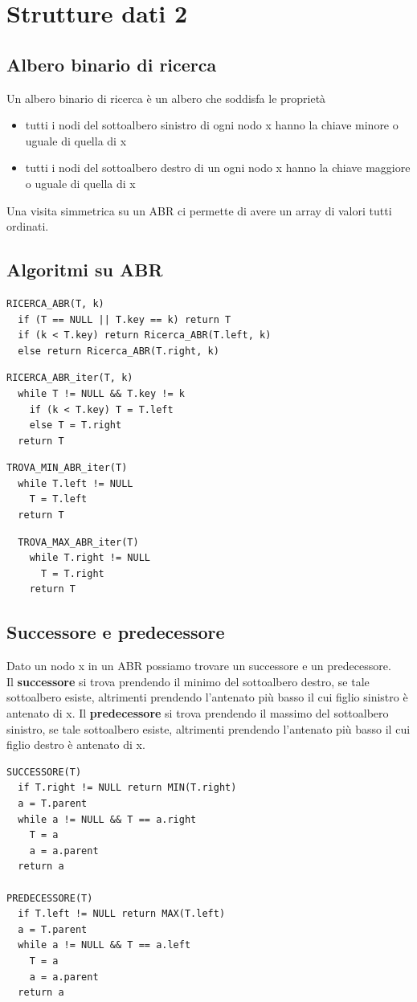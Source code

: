 \documentclass{article}
\begin{document}
\section{Strutture dati 2}
\subsection{Albero binario di ricerca}
Un albero binario di ricerca è un albero che soddisfa le proprietà
\begin{itemize}
  \item tutti i nodi del sottoalbero sinistro di ogni nodo x hanno la chiave minore o uguale di quella di x
  \item tutti i nodi del sottoalbero destro di un ogni nodo x hanno la chiave maggiore o uguale di quella di x
\end{itemize}
Una visita simmetrica su un ABR ci permette di avere un array di valori tutti ordinati.
\subsection*{Algoritmi su ABR}
\begin{lstlisting}
RICERCA_ABR(T, k)
  if (T == NULL || T.key == k) return T
  if (k < T.key) return Ricerca_ABR(T.left, k)
  else return Ricerca_ABR(T.right, k)
\end{lstlisting}
\begin{lstlisting}
RICERCA_ABR_iter(T, k)
  while T != NULL && T.key != k
    if (k < T.key) T = T.left
    else T = T.right
  return T
\end{lstlisting}
\begin{lstlisting}
TROVA_MIN_ABR_iter(T)
  while T.left != NULL
    T = T.left
  return T
\end{lstlisting}
\begin{lstlisting}
  TROVA_MAX_ABR_iter(T)
    while T.right != NULL
      T = T.right
    return T
\end{lstlisting}
\subsection*{Successore e predecessore}
Dato un nodo x in un ABR possiamo trovare un successore e un predecessore.\\
Il \textbf{successore} si trova prendendo il minimo del sottoalbero destro, se tale sottoalbero esiste, altrimenti prendendo l'antenato più basso il cui figlio sinistro è antenato di x.
Il \textbf{predecessore} si trova prendendo il massimo del sottoalbero sinistro, se tale sottoalbero esiste, altrimenti prendendo l'antenato più basso il cui figlio destro è antenato di x.
\begin{lstlisting}
SUCCESSORE(T)
  if T.right != NULL return MIN(T.right)
  a = T.parent
  while a != NULL && T == a.right
    T = a
    a = a.parent
  return a

PREDECESSORE(T)
  if T.left != NULL return MAX(T.left)
  a = T.parent
  while a != NULL && T == a.left
    T = a
    a = a.parent
  return a
\end{lstlisting}
\end{document}

